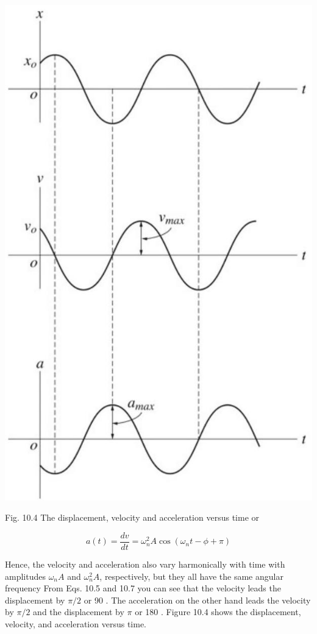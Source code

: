 \documentclass[10pt]{article}
\begin{document}
\begin{center}
\includegraphics[max width=\textwidth]{2024_09_13_db1f357d2aad0a03eb2eg-164}
\end{center}

Fig. 10.4 The displacement, velocity and acceleration versus time or


\begin{equation*}
a(t)=\frac{d v}{d t}=\omega_{n}^{2} A \cos \left(\omega_{n} t-\phi+\pi\right) \tag{10.7}
\end{equation*}


Hence, the velocity and acceleration also vary harmonically with time with amplitudes $\omega_{n} A$ and $\omega_{n}^{2} A$, respectively, but they all have the same angular frequency From Eqs. 10.5 and 10.7 you can see that the velocity leads the displacement by $\pi / 2$ or 90 . The acceleration on the other hand leads the velocity by $\pi / 2$ and the displacement by $\pi$ or 180 . Figure 10.4 shows the displacement, velocity, and acceleration versus time.
\end{document}
